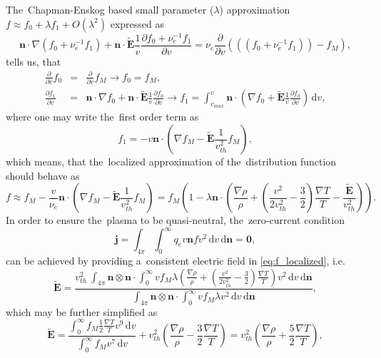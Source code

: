 \documentclass[review]{elsarticle}
\newcommand{\pdv}[2]{\frac{\partial{#1}}{\partial{#2}}}
\newcommand{\vect}[1]{\boldsymbol{#1}}
\newcommand{\dI}{\text{d}}
\newcommand{\mfp}{\lambda}
\newcommand{\nue}{\nu_{e}}
\newcommand{\vmag}{v}
\newcommand{\vth}{v_{th}}
\newcommand{\vn}{\vect{n}}
\newcommand{\tE}{\vect{\tilde{E}}}
\newcommand{\qe}{q_e}
\newcommand{\fM}{f_M}
\begin{document}
The~Chapman-Enskog based small parameter ($\mfp$) approximation 
$f\approx f_0 + \lambda f_1 + O(\lambda^2)$ expressed as
\begin{equation}
  \vn\cdot\nabla (f_0 + \nue^{-1} f_1) + 
  \vn\cdot\tE\frac{1}{\vmag}\pdv{f_0 + \nue^{-1} f_1}{\vmag}
  = \nue \pdv{}{\vmag}\left(\left((f_0 + \nue^{-1} f_1)\right) - \fM\right) ,
  \label{eq:CE_BGK}
\end{equation}
tells us, that
\begin{eqnarray}
  \pdv{}{\vmag}f_0 &=& \pdv{}{\vmag} \fM \rightarrow f_0 = \fM , 
  \nonumber\\
  \pdv{f_1}{\vmag} &=& \vn\cdot\nabla f_0
   + \vn\cdot\tE\frac{1}{\vmag}\pdv{f_0}{\vmag} \rightarrow  f_1
  = \int_{v_{max}}^v \vn\cdot\left( \nabla f_0 + 
  \tE\frac{1}{\vmag}\pdv{f_0}{\vmag}\right)\, \dI\vmag , 
  \nonumber
\end{eqnarray}
where one may write the~first order term as
\begin{equation}
  f_1 = - \vmag \vn\cdot\left( \nabla \fM - \tE\frac{1}{\vth^2}\fM \right) ,
\end{equation}
which means, that the~localized approximation of the~distribution function
should behave as
\begin{equation}
  f \approx \fM 
  - \frac{\vmag}{\nue}\vn\cdot
  \left( \nabla \fM - \tE\frac{1}{\vth^2}\fM \right) 
  = \fM \left(1 - \mfp\vn\cdot\left(\frac{\nabla\rho}{\rho} + 
  \left( \frac{\vmag^2}{2 \vth^2} - \frac{3}{2}\right) \frac{\nabla T}{T} 
  - \frac{\tE}{\vth^2} \right) \right) .
  \label{eq:f_localized}
\end{equation}
In order to ensure the~plasma to be quasi-neutral, the~zero-current condition
\begin{equation}
  \vect{j} = \int_{4\pi}\int_0^{\infty} \qe \vmag \vn f 
  \vmag^2\, \dI\vmag\, \dI\vn 
  = \vect{0} ,
  \label{eq:zero_current}
\end{equation}
can be achieved by providing a~consistent electric field in 
\eqref{eq:f_localized}, i.e.
\begin{equation}
  \tE = \frac{\vth^2~\int_{4\pi} \vn\otimes\vn\cdot \int_0^{\infty} \vmag  
  \fM \mfp\left(\frac{\nabla\rho}{\rho} + 
  \left( \frac{\vmag^2}{2 \vth^2} - \frac{3}{2}\right) 
  \frac{\nabla T}{T}\right)
  \vmag^2\, \dI\vmag\, \dI\vn}
  {\int_{4\pi} \vn\otimes\vn\cdot \int_0^{\infty} \vmag  
  \fM \mfp\vmag^2\, \dI\vmag\, \dI\vn} ,
\end{equation}
which may be further simplified as
\begin{equation}
  \tE = \frac{\int_0^{\infty} \fM
  \frac{1}{2}\frac{\nabla T}{T}\vmag^9\, \dI\vmag}
  {\int_0^{\infty} \fM \vmag^7\, \dI\vmag} + 
  \vth^2\left(\frac{\nabla\rho}{\rho} - \frac{3}{2}\frac{\nabla T}{T} \right)
  = \vth^2\left(\frac{\nabla\rho}{\rho} + \frac{5}{2}\frac{\nabla T}{T} 
  \right) ,
\end{equation}
\end{document}
